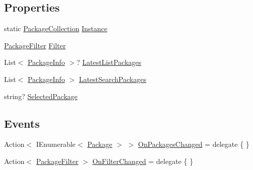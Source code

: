\subsection*{Properties}
\begin{DoxyCompactItemize}
\item 
static \mbox{\hyperlink{class_unity_editor_1_1_package_manager_1_1_u_i_1_1_package_collection}{Package\+Collection}} \mbox{\hyperlink{class_unity_editor_1_1_package_manager_1_1_u_i_1_1_package_collection_a75a698a6c798e48fbddf0e7edbf6db71}{Instance}}
\item 
\mbox{\hyperlink{namespace_unity_editor_1_1_package_manager_1_1_u_i_aec89f744729646d8e261787be78942c8}{Package\+Filter}} \mbox{\hyperlink{class_unity_editor_1_1_package_manager_1_1_u_i_1_1_package_collection_ae9d3d53d670427dfbe398441d7be141e}{Filter}}
\item 
List$<$ \mbox{\hyperlink{class_unity_editor_1_1_package_manager_1_1_u_i_1_1_package_info}{Package\+Info}} $>$? \mbox{\hyperlink{class_unity_editor_1_1_package_manager_1_1_u_i_1_1_package_collection_aecaff6ca4f7866ee058b7c70d3aa49bc}{Latest\+List\+Packages}}
\item 
List$<$ \mbox{\hyperlink{class_unity_editor_1_1_package_manager_1_1_u_i_1_1_package_info}{Package\+Info}} $>$ \mbox{\hyperlink{class_unity_editor_1_1_package_manager_1_1_u_i_1_1_package_collection_a38b81a3076cdebddbfb0e4e09c0e807f}{Latest\+Search\+Packages}}
\item 
string? \mbox{\hyperlink{class_unity_editor_1_1_package_manager_1_1_u_i_1_1_package_collection_a1016b6f0d5db71f12b7e3948e8707841}{Selected\+Package}}
\end{DoxyCompactItemize}
\subsection*{Events}
\begin{DoxyCompactItemize}
\item 
Action$<$ I\+Enumerable$<$ \mbox{\hyperlink{class_unity_editor_1_1_package_manager_1_1_u_i_1_1_package}{Package}} $>$ $>$ \mbox{\hyperlink{class_unity_editor_1_1_package_manager_1_1_u_i_1_1_package_collection_a41622c71bb27ca9e063a73e09dffb382}{On\+Packages\+Changed}} = delegate \{ \}
\item 
Action$<$ \mbox{\hyperlink{namespace_unity_editor_1_1_package_manager_1_1_u_i_aec89f744729646d8e261787be78942c8}{Package\+Filter}} $>$ \mbox{\hyperlink{class_unity_editor_1_1_package_manager_1_1_u_i_1_1_package_collection_afdd6859364e3a88ba00e9a3d9e092c09}{On\+Filter\+Changed}} = delegate \{ \}
\end{DoxyCompactItemize}


